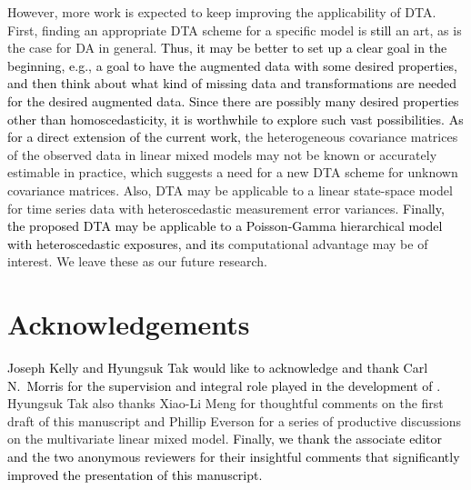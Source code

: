 \documentclass[12pt]{article}
\begin{document}
However, more work is expected to keep improving the  applicability of DTA. First, finding an appropriate DTA scheme  for a specific model is \textcolor{black}{still} an art, as is the case for DA  in general. \textcolor{black}{Thus, it may be better to set up a clear goal in the beginning, e.g., a goal to have the augmented data with some desired properties, and then think about what kind of missing data and transformations are needed for the desired augmented data. Since there are possibly many desired properties other than homoscedasticity, it is worthwhile to explore such vast possibilities. As for a direct extension of the current work,}  the heterogeneous covariance matrices of the observed data in linear mixed models may not be known or accurately estimable in practice, which suggests a need for a new DTA scheme for unknown covariance matrices. Also, DTA may be applicable to a linear state-space model for time series data with heteroscedastic measurement error variances. \textcolor{black}{Finally, the proposed DTA may be applicable to a Poisson-Gamma hierarchical model with heteroscedastic exposures, and its} computational advantage may be of interest.   We leave these as our future research.

\section*{Acknowledgements}\label{ack}

\textcolor{black}{Joseph Kelly and Hyungsuk Tak would like to acknowledge and thank Carl N.~Morris for the supervision and integral role played in the development of \cite{kelly2014advances}.}   Hyungsuk Tak also thanks Xiao-Li Meng for  thoughtful comments on the first draft of this manuscript and Phillip Everson for a series of productive discussions on the multivariate linear mixed model. \textcolor{black}{Finally, we thank the associate editor and the two anonymous reviewers for their insightful comments that  significantly improved the presentation of this manuscript.}


\end{document}

